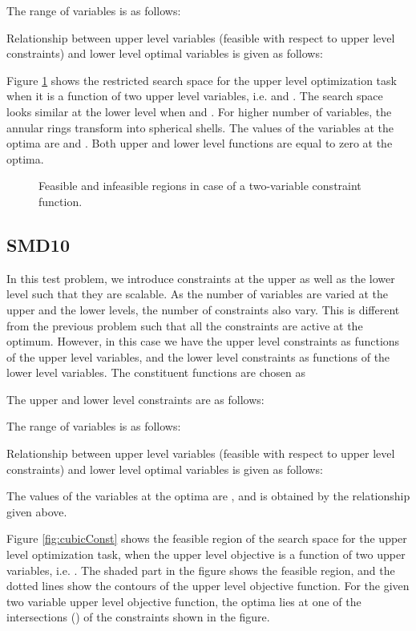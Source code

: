 \documentclass[twoside]{article}
\begin{document}
The range of variables is as follows:

Relationship between upper level variables (feasible with respect to upper level constraints) and lower level optimal variables is given as follows:

Figure \ref{fig:annular} shows the restricted search space for the upper level optimization task when it is a function of two upper level variables, i.e.  and . The search space looks similar at the lower level when  and . For higher number of variables, the annular rings transform into spherical shells. The values of the variables at the optima are  and . Both upper and
lower level functions are equal to zero at the optima.

\begin{figure}
\begin{center}
\caption{Feasible and infeasible regions in case of a two-variable constraint function.}
\label{fig:annular}
\end{center}
\end{figure}

\subsection{SMD10}
In this test problem, we introduce constraints at the upper as well as the lower level such that they are scalable. As the number of variables are varied at the upper and the lower levels, the number of constraints also vary. This is different from the previous problem such that all the constraints are active at the optimum. However, in this case we have the upper level constraints as functions of the upper level variables, and the lower level constraints as functions of the lower level variables. The constituent functions are chosen as

The upper and lower level constraints are as follows:

The range of variables is as follows:

Relationship between upper level variables (feasible with respect to upper level constraints) and lower level optimal variables is given as follows:

The values of the variables at the optima are , and  is obtained by the relationship given above.

Figure \ref{fig:cubicConst} shows the feasible region of the search space for the upper level optimization task, when the upper level objective is a function of two upper variables, i.e. . The shaded part in the figure shows the feasible region, and the dotted lines show the contours of the upper level objective function. For the given two variable upper level objective function, the optima lies at one of the intersections () of the constraints shown in the figure.
\end{document}
